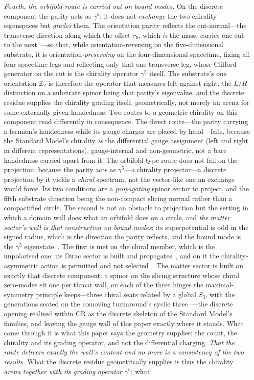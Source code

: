 \documentclass[11pt]{article}
\theoremstyle{plain}
\theoremstyle{remark}
\begin{document}
\emph{Fourth, the orbifold route is carried out on bound modes.} On the discrete component the parity acts as $\gamma^5$: it does not \emph{exchange} the two chirality eigenspaces but \emph{grades} them. The orientation parity reflects the cut-normal---the transverse direction along which the offset $r_0$, which \emph{is} the mass, carries one cut to the next~\cite{JanzenOperator, JanzenAlgebroid}---so that, while orientation-reversing on the five-dimensional substrate, it is orientation-\emph{preserving} on the four-dimensional spacetime, fixing all four spacetime legs and reflecting only that one transverse leg, whose Clifford generator on the cut is the chirality operator $\gamma^5$ itself. The substrate's one orientation $\mathbb{Z}_2$ is therefore the operator that measures left against right, the $L/R$ distinction on a substrate spinor being that parity's eigenvalue, and the discrete residue supplies the chirality grading itself, geometrically, not merely an arena for some externally-given handedness. Two routes to a geometric chirality on this component read differently in consequence. The direct route---the parity carrying a fermion's handedness while its gauge charges are placed by hand---fails, because the Standard Model's chirality \emph{is} the differential gauge assignment (left and right in different representations), gauge-internal and non-geometric, not a bare handedness carried apart from it. The orbifold-type route does not fail on the projection: because the parity acts as $\gamma^5$---a chirality projector---a discrete projection by it yields a \emph{chiral} spectrum, not the vector-like one an exchange would force. Its two conditions are a \emph{propagating} spinor sector to project, and the fifth substrate direction being the non-compact slicing normal rather than a compactified circle. The second is not an obstacle to projection but the setting in which a domain wall does what an orbifold does on a circle, and \emph{the matter sector's wall is that construction on bound modes}: its superpotential is odd in the signed radius, which is the direction the parity reflects, and the bound mode is the $\gamma^5$ eigenstate~\cite{JanzenMatter}. The first is met on the chiral member, which is the unpolarised one: its Dirac sector is built and propagates~\cite{JanzenDynamics}, and on it the chirality-asymmetric action is permitted and not selected~\cite{JanzenMatter}. The matter sector is built on exactly that discrete component: a spinor on the slicing structure whose chiral zero-modes sit one per throat wall, on each of the three hinges the maximal-symmetry principle keeps---three chiral seats related by a global $S_3$, with the generations seated on the comoving turnaround's cyclic three~\cite{JanzenMatter}---the discrete opening realised within CR as the discrete skeleton of the Standard Model's families, and leaving the gauge wall of this paper exactly where it stands. What came through it is what this paper says the geometry supplies: the count, the chirality and its grading operator, and not the differential charging. \emph{That the route delivers exactly the wall's content and no more is a consistency of the two results.} What the discrete residue geometrically supplies is thus the chirality \emph{arena together with its grading operator} $\gamma^5$; what 
\end{document}
